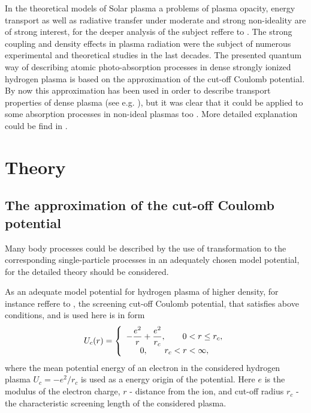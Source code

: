 \documentclass[a1]{sciposter}
\begin{document}
\begin{multicols}{3}
In the theoretical models of Solar plasma a problems of plasma opacity, energy transport as well as radiative transfer under moderate and strong non-ideality are of strong interest, for the deeper analysis of the subject reffere to \cite{for99, rog98, mih11, mih13}. The strong coupling and density effects in plasma radiation were the subject of numerous experimental and theoretical studies in the last decades. The presented quantum way of describing atomic photo-absorption processes in dense strongly ionized hydrogen plasma is based on the approximation of the cut-off Coulomb potential. By now this approximation has been used in order to describe transport properties of dense plasma (see e.g. \cite{for99, mih89, ign17}), but it was clear that it could be applied to some absorption processes in non-ideal plasmas too \cite{mih11,mih11c,mih15a,sak05}. More detailed explanation could be find in \cite{Sakan_atoms_2018}. 


\section{Theory}

\subsection{The approximation of the cut-off Coulomb potential}

Many body processes could be described by the use of transformation to the corresponding single-particle processes in an adequately chosen model potential, for the detailed theory \cite{Sakan_atoms_2018} should be considered.

As an adequate model potential for hydrogen plasma of higher density, for instance reffere to \cite{mih89,mih11}, the screening cut-off Coulomb potential, that satisfies above conditions, and is used here is in form
\begin{equation}
\label{eq:U0} U_{c}(r) = \left\{
\begin{array}{c c}
- \displaystyle \frac{e^2}{r} + \displaystyle \frac{e^2}{r_c},
\qquad            0 < r \le r_{c},
\\
\displaystyle 0 ,              \qquad      r_{c} < r < \infty,
\end{array}
\right.
\end{equation}
{\noindent where the mean potential energy of an electron
in the considered hydrogen plasma $U_{c}= -e^{2}/r_{c}$ is used as a energy origin of the potential. Here $e$ is the modulus of the electron charge, $r$ - distance from the ion, and cut-off radius $r_{c}$ - the characteristic screening length of the considered plasma.}


\end{multicols}
\end{document}
